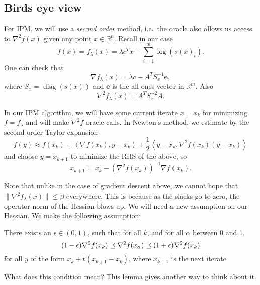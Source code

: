 \documentclass[11pt]{article}
\newcommand{\inprod}[1]{\left\langle #1 \right\rangle}
\newcommand{\R}{\mathbb{R}}
\newcommand {\onevec}{\mathbf{e}}
\begin{document}
\subsection{Birds eye view}
For IPM, we will use a {\em second order} method, i.e.\ the oracle also allows us access to $\nabla^2 f(x)$ given any point $x\in\R^n$. Recall in our case
$$
f(x) = f_\lambda(x) = \lambda c^T x  -\sum_{i=1}^m \log(s(x)_i) .
$$
One can check that
$$
\nabla f_\lambda(x) = \lambda c - A^T S_x^{-1} \onevec ,
$$
where $S_x = \mathop{diag}(s(x))$ and $\onevec$ is the all ones vector in $\R^m$. Also
$$
\nabla^2 f_\lambda(x) = A^T S_x^{-2} A .
$$


In our IPM algorithm, we will have some current iterate $x=x_k$ for minimizing $f = f_\lambda$ and will make $\nabla^2 f$ oracle calls. In Newton's method, we estimate by the second-order Taylor expansion
$$
f(y) \approx f(x_k) + \inprod{\nabla f(x_k), y - x_k} + \frac 12 \inprod{y-x_k, \nabla^2 f(x_k) (y-x_k)} 
$$
and choose $y = x_{k+1}$ to minimize the RHS of the above, so
$$
x_{k+1} = x_k - (\nabla^2 f(x_k))^{-1} \nabla f(x_k) .
$$

Note that unlike in the case of gradient descent above, we cannot hope that $\|\nabla^2 f_\lambda(x)\| \le \beta$ everywhere. This is because as the slacks go to zero, the operator norm of the Hessian blows up. We will need a new assumption on our Hessian. We make the following assumption:

There exists an $\epsilon \in (0, 1)$, such that for all $k$, and for all $\alpha$ between 0 and 1, 
\begin{equation}
(1-\epsilon) \nabla^2 f(x_k) \preceq \nabla^2 f(x_\alpha) \preceq (1+\epsilon)\nabla^2 f(x_k) \label{eqn:control-hessian}
\end{equation}
for all $y$ of the form $x_k + t(x_{k+1}-x_k)$, where $x_{k+1}$ is the next iterate

What does this condition mean? This lemma gives another way to think about it.
\end{document}
